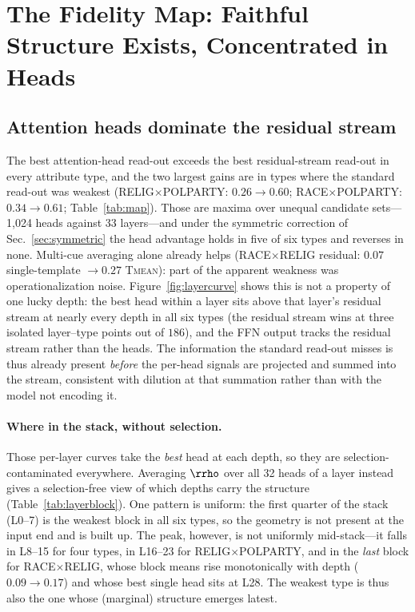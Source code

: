\section{The Fidelity Map: Faithful Structure Exists, Concentrated in Heads}
\label{sec:act2}

\subsection{Attention heads dominate the residual stream}
The best attention-head read-out exceeds the best residual-stream
read-out in every attribute type, and the two largest gains are in types
where the standard read-out was weakest (RELIG$\times$POLPARTY:
$0.26\!\to\!0.60$; RACE$\times$POLPARTY: $0.34\!\to\!0.61$;
Table~\ref{tab:map}). Those are maxima over unequal candidate
sets---1{,}024 heads against 33 layers---and under the symmetric
correction of Sec.~\ref{sec:symmetric} the head advantage holds in five
of six types and reverses in none.
Multi-cue averaging alone already helps (RACE$\times$RELIG residual:
$0.07$ single-template $\to0.27$ \textsc{Tmean}): part of the apparent
weakness was operationalization noise. Figure~\ref{fig:layercurve} shows
this is not a property of one lucky depth: the best head within a layer
sits above that layer's residual stream at nearly every depth in all six
types (the residual stream wins at three isolated layer--type points
out of $186$), and the FFN output tracks the residual stream rather
than the heads. The information the standard read-out misses is thus already
present \emph{before} the per-head signals are projected and summed into
the stream, consistent with dilution at that summation rather than with
the model not encoding it.

\paragraph{Where in the stack, without selection.} Those per-layer curves
take the \emph{best} head at each depth, so they are
selection-contaminated everywhere. Averaging $\rrho$ over all 32 heads of
a layer instead gives a selection-free view of which depths carry the
structure (Table~\ref{tab:layerblock}). One pattern is uniform: the first quarter
of the stack (L0--7) is the weakest block in all six types, so the
geometry is not present at the input end and is built up. The peak,
however, is not uniformly mid-stack---it falls in L8--15 for four types,
in L16--23 for RELIG$\times$POLPARTY, and in the \emph{last} block for
RACE$\times$RELIG, whose block means rise monotonically with depth
($0.09\!\to\!0.17$) and whose best single head sits at L28. The weakest
type is thus also the one whose (marginal) structure emerges latest.

